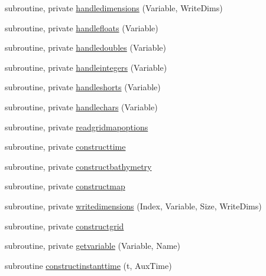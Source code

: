 \begin{DoxyCompactItemize}
subroutine, private \mbox{\hyperlink{namespacemoduleera40format_a2dffd2c3e28995426ed11ff1f4ca7ad9}{handledimensions}} (Variable, Write\+Dims)
\item 
subroutine, private \mbox{\hyperlink{namespacemoduleera40format_a9389939d144e12060ff692086e9af89e}{handlefloats}} (Variable)
\item 
subroutine, private \mbox{\hyperlink{namespacemoduleera40format_a54957082dfc56590cf35c0fb8138161f}{handledoubles}} (Variable)
\item 
subroutine, private \mbox{\hyperlink{namespacemoduleera40format_a90dfe4450bbbd59c764d529d05f92d76}{handleintegers}} (Variable)
\item 
subroutine, private \mbox{\hyperlink{namespacemoduleera40format_a0a0c22e410451c81e0c573ad2174504f}{handleshorts}} (Variable)
\item 
subroutine, private \mbox{\hyperlink{namespacemoduleera40format_a496e3a66acda20102bdeaa457f8faf96}{handlechars}} (Variable)
\item 
subroutine, private \mbox{\hyperlink{namespacemoduleera40format_a4218771d6a94493f1954c06107f7ec1e}{readgridmapoptions}}
\item 
subroutine, private \mbox{\hyperlink{namespacemoduleera40format_a866d19867c0e3bcef28981a8907ea516}{constructtime}}
\item 
subroutine, private \mbox{\hyperlink{namespacemoduleera40format_a73e47fa652795fc4885fa7d6a5c34503}{constructbathymetry}}
\item 
subroutine, private \mbox{\hyperlink{namespacemoduleera40format_a45bd99707035a442354f99cd2597f1e5}{constructmap}}
\item 
subroutine, private \mbox{\hyperlink{namespacemoduleera40format_aeddab9fd7b3d953ed10b899ae10ef9bb}{writedimensions}} (Index, Variable, Size, Write\+Dims)
\item 
subroutine, private \mbox{\hyperlink{namespacemoduleera40format_ad847a1e5d762ac9c9f77372614efda16}{constructgrid}}
\item 
subroutine, private \mbox{\hyperlink{namespacemoduleera40format_ad2e0367ac675a7a629eb4baf66bcf7c6}{getvariable}} (Variable, Name)
\item 
subroutine \mbox{\hyperlink{namespacemoduleera40format_afe5dcd73c50804212a7b39e48bf7d428}{constructinstanttime}} (t, Aux\+Time)
\end{DoxyCompactItemize}
